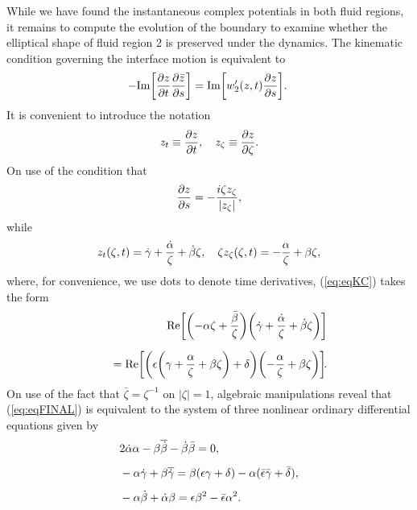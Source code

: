\documentclass{article}
\begin{document}
While we have  found the instantaneous complex potentials in both fluid regions,
it remains to compute the evolution of the boundary to examine whether the
elliptical shape of fluid region 2 is preserved under the dynamics. The kinematic
condition governing the interface motion is equiva\-lent to 
\begin{equation}
\hspace*{-3pt}-{\rm Im}{\left[{\partial z \over \partial t} {\partial \bar z \over 
\partial s} \right]}
= {\rm Im}{\left[w_2'(z,t) {\partial z \over \partial s} \right]}.\label{eq:eqKC}
\end{equation}
It is convenient to introduce the notation
\begin{equation}
z_t \equiv {\partial z \over \partial t}, \quad
z_\zeta \equiv {\partial z \over \partial \zeta}.
\end{equation}
On use of the condition that 
\begin{equation}
{\partial z \over \partial s} = -{i \zeta z_\zeta \over |z_\zeta|},
\end{equation}
while
\begin{equation}
z_t(\zeta,t) = \dot \gamma + {\dot \alpha \over \zeta} + \dot \beta \zeta,
\quad  \zeta z_\zeta(\zeta,t) = -{ \alpha \over \zeta} + \beta \zeta,
\end{equation}
where, for convenience, we use dots to denote time derivatives,
(\ref{eq:eqKC})
takes the form\vspace*{3pt}
\begin{eqnarray}
&&\displaystyle {\rm Re} {\left[{\left( -\alpha \zeta +{\bar \beta \over \zeta} \right )}
{\left(\dot \gamma + {\dot \alpha \over \zeta} + \dot \beta \zeta
\right)}\right]}\notag\\[6pt]
&&\quad = {\rm Re} {\left[{\left(\epsilon
{\left (\gamma + { \alpha \over \zeta} + \beta \zeta
\right)} + \delta \right )}
{\left(-{\alpha \over \zeta} +{\beta \zeta} \right )}
 \right]}\!.\label{eq:eqFINAL}
\end{eqnarray}
On use of the fact that $\bar \zeta=\zeta^{-1}$
on $|\zeta|=1$, algebraic manipulations reveal
that (\ref{eq:eqFINAL}) is equivalent to the 
system of three nonlinear ordinary differential equations given by
\begin{align}
&\displaystyle 2 \dot \alpha \alpha - \beta \overline{\dot \beta} - \dot \beta \bar \beta =0, \notag\\[5pt]
&\displaystyle -\alpha \dot \gamma + \beta \overline{\dot \gamma} = \beta (\epsilon \gamma
+ \delta) - \alpha (\bar \epsilon \bar \gamma + \bar \delta), \notag\\[5pt]
&\displaystyle -\alpha \dot \beta + \dot \alpha \beta = \epsilon \beta^2 - \bar \epsilon\alpha^2.
\label{eq:eqD3}
\end{align}
\end{document}
